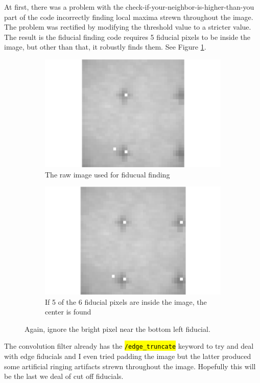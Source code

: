 \documentclass[10pt]{scrartcl}
\begin{document}
At first, there was a problem with the check-if-your-neighbor-is-higher-than-you part of the code incorrectly finding local maxima strewn throughout the image. The problem was rectified by modifying the threshold value to a stricter value. The result is the fiducial finding code requires 5 fiducial pixels to be inside the image, but other than that, it robustly finds them. See Figure \ref{ohyeah}.

\begin{figure}[!ht]
    \centering
    \hspace{-1.0in}
    \begin{subfigure}[b]{.45\linewidth}
        \centering
        \includegraphics[width=1.3\textwidth]{../plots_tables_images/badcrop.png}
        \caption{The raw image used for fiducual finding} 
    \end{subfigure}
    \hspace{.5in}
    \begin{subfigure}[b]{.45\linewidth}
        \centering
        \includegraphics[width=1.3\textwidth]{../plots_tables_images/lessbad.png}
        \caption{If 5 of the 6 fiducial pixels are inside the image, the center is found}
    \end{subfigure}
    \caption{Again, ignore the bright pixel near the bottom left fiducial.}
    \label{ohyeah}
\end{figure}

The convolution filter already has the \hl{\texttt{/edge\_truncate}} keyword to try and deal with edge fiducials and I even tried padding the image but the latter produced some artificial ringing artifacts strewn throughout the image. Hopefully this will be the last we deal of cut off fiducials.

\end{document}
